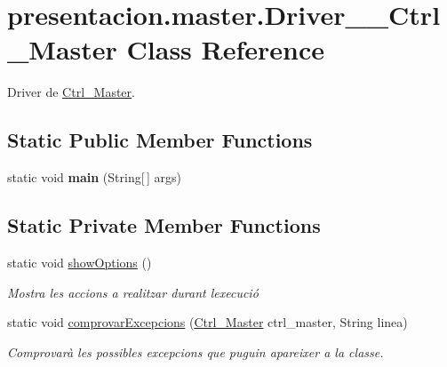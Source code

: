 \hypertarget{classpresentacion_1_1master_1_1Driver____Ctrl__Master}{}\section{presentacion.\+master.\+Driver\+\_\+\+\_\+\+Ctrl\+\_\+\+Master Class Reference}
\label{classpresentacion_1_1master_1_1Driver____Ctrl__Master}


Driver de \hyperlink{classpresentacion_1_1master_1_1Ctrl__Master}{Ctrl\+\_\+\+Master}.  


\subsection*{Static Public Member Functions}
\begin{DoxyCompactItemize}
\item 
\mbox{\label{classpresentacion_1_1master_1_1Driver____Ctrl__Master_a4965d356e9bd0a56c753c3a2d296b7cc}} 
static void {\bfseries main} (String\mbox{[}$\,$\mbox{]} args)
\end{DoxyCompactItemize}
\subsection*{Static Private Member Functions}
\begin{DoxyCompactItemize}
\item 
\mbox{\label{classpresentacion_1_1master_1_1Driver____Ctrl__Master_a2e2f7cbdade58f6871d3695e24b08305}} 
static void \hyperlink{classpresentacion_1_1master_1_1Driver____Ctrl__Master_a2e2f7cbdade58f6871d3695e24b08305}{show\+Options} ()
\begin{DoxyCompactList}\small\item\em Mostra les accions a realitzar durant l\textquotesingle{}execució \end{DoxyCompactList}\item 
static void \hyperlink{classpresentacion_1_1master_1_1Driver____Ctrl__Master_ae522ded3194d6be2aa68cc60b7590716}{comprovar\+Excepcions} (\hyperlink{classpresentacion_1_1master_1_1Ctrl__Master}{Ctrl\+\_\+\+Master} ctrl\+\_\+master, String linea)
\begin{DoxyCompactList}\small\item\em Comprovarà les possibles excepcions que puguin apareixer a la classe. \end{DoxyCompactList}\end{DoxyCompactItemize}
